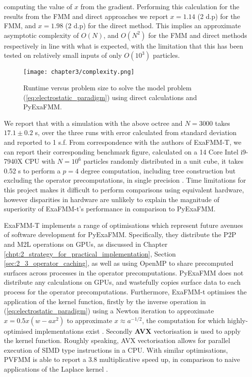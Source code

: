 computing the value of $x$ from the gradient. Performing this calculation for the
results from the \gls{FMM} and direct approaches we report $x=1.14$ (2 d.p) for
the FMM, and $x=1.98$ (2 d.p) for the direct method. This implies an approximate
asymptotic complexity of $O(N)$, and $O(N^2)$ for the \gls{FMM} and direct methods
respectively in line with what is expected, with the limitation that this has
been tested on relatively small inputs of only $O(10^3)$ particles.

\begin{figure}[ht]
    \centering

  {\texttt{[image: chapter3/complexity.png]}}
  \vspace{0pt}
    \caption{
        Runtime versus problem size to solve the model problem
        (\ref{eq:electrostatic_paradigm}) using direct calculations and
        \gls{PyExaFMM}.
    }
    \label{fig:3_1_complexity}
\end{figure}

We report that with a simulation with the above octree and
$N=3000$ takes $17.1 \pm 0.2$ s, over the three runs with
error calculated from standard deviation and reported to 1 s.f. From correspondence
with the authors of ExaFMM-T, we can report their corresponding benchmark figure,
calculated on a 14 Core Intel i9-7940X \gls{CPU} with $N=10^6$ particles
randomly distributed in a unit cube, it takes 0.52 s to perform a $p=4$ degree
computation, including tree construction but excluding the
operator precomputations, in single precision \cite{exafmm}. Time limitations for this project
makes it difficult to perform comparisons using equivalent hardware, however
disparities in hardware are unlikely to explain the magnitude of superiority
of ExaFMM-t's performance in comparison to \gls{PyExaFMM}.

ExaFMM-T implements a range of optimisations which represent future avenues
of software development for \gls{PyExaFMM}. Specifically, they distribute the
\gls{P2P} and \gls{M2L} operations on \gls{GPU}s, as discussed in Chapter
\ref{chpt:2_strategy_for_practical_implementation},
Section \ref{sec:2_3_operator_caching}, as well as using \gls{OpenMP} to share
precomputed surfaces across processes in the operator precomputations.
\gls{PyExaFMM} does not distribute any calculations on \gls{GPU}s, and
wastefully copies surface data to each process for the operator precomputations.
Furthermore, ExaFMM-t optimises the application of the kernel function,
firstly by the inverse operation in (\ref{eq:electrostatic_paradigm}) using a Newton
iteration to approximate $x = 0.5x(w-ax^2)$ to approximate $x \approx a ^{-1/2}$,
the computation for which highly-optimised implementations exist
\cite{Lomont:2003, sqrt}. Secondly \textbf{\gls{AVX}} vectorisation is used
to apply the kernel function. Roughly speaking, \gls{AVX} vectorisation allows
for parallel execution of \gls{SIMD} type instructions in a \gls{CPU}. With similar
optimisations, PVFMM is able to report a 3.8 multiplicative speed up, in
comparison to naive applications of the Laplace kernel \cite{Malhotra:2015:CCP}.

\pagebreak